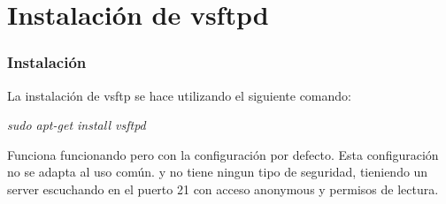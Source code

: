 \section{Instalaci\'on de vsftpd}
  \begin{frame}
    \frametitle{Instalaci\'on}
		La instalaci\'on de vsftp se hace utilizando el siguiente comando:\\
		\begin{center}
		\textit{sudo apt-get install vsftpd}
		\end{center}

		Funciona funcionando pero con la configuración por defecto. Esta configuración no se adapta al uso común. y no tiene ningun tipo de seguridad, tieniendo un server escuchando en el puerto 21 con acceso anonymous y permisos de lectura.
  \end{frame}